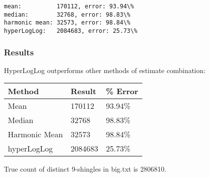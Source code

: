 \documentclass[11pt]{article}
\begin{document}
    \begin{Verbatim}[commandchars=\\\{\}]
mean:          170112, error: 93.94\%
median:        32768, error: 98.83\%
harmonic mean: 32573, error: 98.84\%
hyperLogLog:   2084683, error: 25.73\%

    \end{Verbatim}

    \hypertarget{results}{%
\subsubsection{Results}\label{results}}

HyperLogLog outperforms other methods of estimate combination:

\begin{longtable}[]{@{}lll@{}}
\toprule
Method & Result & \% Error\tabularnewline
\midrule
\endhead
Mean & 170112 & 93.94\%\tabularnewline
Median & 32768 & 98.83\%\tabularnewline
Harmonic Mean & 32573 & 98.84\%\tabularnewline
hyperLogLog & 2084683 & 25.73\%\tabularnewline
\bottomrule
\end{longtable}

True count of distinct 9-shingles in big.txt is 2806810.


    
    
    
    
\end{document}
